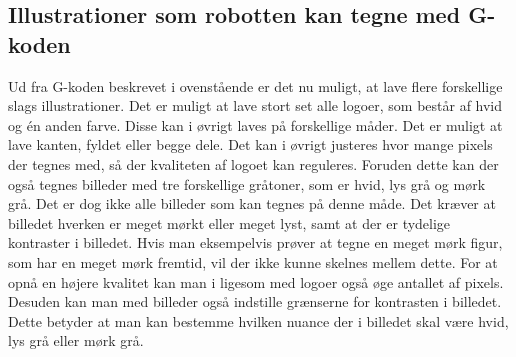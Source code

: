 \subsection{Illustrationer som robotten kan tegne med G-koden}
Ud fra G-koden beskrevet i ovenstående er det nu muligt, at lave flere forskellige slags illustrationer. 
Det er muligt at lave stort set alle logoer, som består af hvid og én anden farve. Disse kan i øvrigt laves på forskellige måder. Det er muligt at lave kanten, fyldet eller begge dele. Det kan i øvrigt justeres hvor mange pixels der tegnes med, så der kvaliteten af logoet kan reguleres. 
Foruden dette kan der også tegnes billeder med tre forskellige gråtoner, som er hvid, lys grå og mørk grå. 
Det er dog ikke alle billeder som kan tegnes på denne måde. Det kræver at billedet hverken er meget mørkt eller meget lyst, samt at der er tydelige kontraster i billedet. Hvis man eksempelvis prøver at tegne en meget mørk figur, som har en meget mørk fremtid, vil der ikke kunne skelnes mellem dette. 
 For at opnå en højere kvalitet kan man i ligesom med logoer også øge antallet af pixels. Desuden kan man med billeder også indstille grænserne for kontrasten i billedet. Dette betyder at man kan bestemme hvilken nuance der i billedet skal være hvid, lys grå eller mørk grå. 